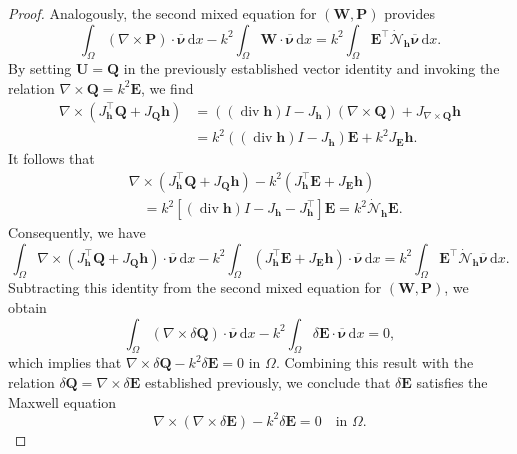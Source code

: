 \documentclass[12pt,reqno]{amsart}
\theoremstyle{definition}
\numberwithin{equation}{section}
\begin{document}
\begin{proof}
Analogously, the second mixed equation for $(\mathbf{W}, \mathbf{P})$ provides
\[
\int_\Omega
(\nabla\times\mathbf{P})\cdot\overline{\boldsymbol{\nu}}\,\mathrm{d}x
-
k^2\int_\Omega
\mathbf{W}\cdot\overline{\boldsymbol{\nu}}\,\mathrm{d}x
=
k^2\int_\Omega
\mathbf{E}^\top\dot{\mathcal{N}}_{\mathbf{h}}
\overline{\boldsymbol{\nu}}\,\mathrm{d}x.
\]
By setting $\mathbf{U}=\mathbf{Q}$ in the previously established vector identity and invoking the relation $\nabla\times\mathbf{Q}=k^2\mathbf{E}$, we find
\[
\begin{aligned}
\nabla\times
\left(
J_{\mathbf{h}}^{\top}\mathbf{Q}+J_{\mathbf{Q}}\mathbf{h}
\right)
&=
\left((\operatorname{div}\mathbf{h})I-J_{\mathbf{h}}\right)
(\nabla\times\mathbf{Q})
+
J_{\nabla\times\mathbf{Q}}\mathbf{h}
\\
&=
k^2
\left((\operatorname{div}\mathbf{h})I-J_{\mathbf{h}}\right)\mathbf{E}
+
k^2J_{\mathbf{E}}\mathbf{h}.
\end{aligned}
\]
It follows that
\[
\begin{aligned}
&\nabla\times
\left(
J_{\mathbf{h}}^{\top}\mathbf{Q}+J_{\mathbf{Q}}\mathbf{h}
\right)
-
k^2
\left(
J_{\mathbf{h}}^{\top}\mathbf{E}+J_{\mathbf{E}}\mathbf{h}
\right)
\\
&\quad=
k^2
\left[
(\operatorname{div}\mathbf{h})I-J_{\mathbf{h}}-J_{\mathbf{h}}^{\top}
\right]\mathbf{E}
=
k^2\dot{\mathcal{N}}_{\mathbf{h}}\mathbf{E}.
\end{aligned}
\]
Consequently, we have
\[
\int_\Omega
\nabla\times
\left(J_{\mathbf{h}}^{\top}\mathbf{Q}+J_{\mathbf{Q}}\mathbf{h}\right)
\cdot\overline{\boldsymbol{\nu}}\,\mathrm{d}x
-
k^2\int_\Omega
\left(J_{\mathbf{h}}^{\top}\mathbf{E}+J_{\mathbf{E}}\mathbf{h}\right)
\cdot\overline{\boldsymbol{\nu}}\,\mathrm{d}x
=
k^2\int_\Omega
\mathbf{E}^\top
\dot{\mathcal{N}}_{\mathbf{h}}
\overline{\boldsymbol{\nu}}\,\mathrm{d}x.
\]
Subtracting this identity from the second mixed equation for $(\mathbf{W}, \mathbf{P})$, we obtain
\[
\int_\Omega
(\nabla\times\delta\mathbf{Q})\cdot\overline{\boldsymbol{\nu}}\,\mathrm{d}x
-
k^2\int_\Omega
\delta\mathbf{E}\cdot\overline{\boldsymbol{\nu}}\,\mathrm{d}x
=0,
\]
which implies that $\nabla\times\delta\mathbf{Q}-k^2\delta\mathbf{E}=0$ in $\Omega$. Combining this result with the relation $\delta\mathbf{Q}=\nabla\times\delta\mathbf{E}$ established previously, we conclude that $\delta \mathbf{E}$ satisfies the  Maxwell equation
\[
\nabla\times(\nabla\times\delta\mathbf{E})-k^2\delta\mathbf{E}=0 \quad \text{in } \Omega.
\]


\end{proof}
\end{document}
